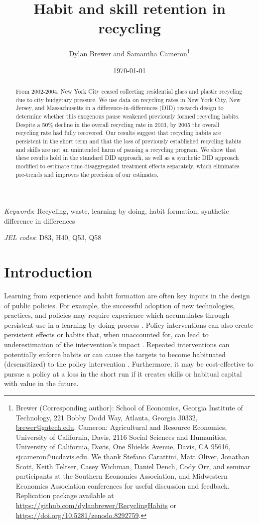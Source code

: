 \documentclass[12pt]{article}
\title{Habit and skill retention in recycling}
\author{Dylan Brewer and Samantha Cameron\thanks{Brewer (Corresponding author): School of Economics, Georgia Institute of Technology, 221 Bobby Dodd Way, Atlanta, Georgia 30332, \href{mailto:brewer@gatech.edu}{brewer@gatech.edu}.  Cameron: Agricultural and Resource Economics, University of California, Davis, 2116 Social Sciences and Humanities, University of California, Davis, One Shields Avenue, Davis, CA 95616, \href{mailto:sjcameron@ucdavis.edu}{sjcameron@ucdavis.edu}.  We thank Stefano Carattini, Matt Oliver, Jonathan Scott, Keith Teltser, Casey Wichman, Daniel Dench, Cody Orr, and seminar participants at the Southern Economics Association, and Midwestern Economics Association conferences for useful discussion and feedback. Replication package available at \href{https://github.com/dylanbrewer/RecyclingHabits}{https://github.com/dylanbrewer/RecyclingHabits} or \href{https://doi.org/10.5281/zenodo.8292759}{https://doi.org/10.5281/zenodo.8292759}.}}
\date{\today}
\begin{document}
\maketitle

\begin{abstract}
\begin{singlespace}
\noindent
From 2002-2004, New York City ceased collecting residential glass and plastic recycling due to city budgetary pressure.  We use data on recycling rates in New York City, New Jersey, and Massachusetts in a difference-in-differences (DID) research design to determine whether this exogenous pause weakened previously formed recycling habits.  Despite a 50\% decline in the overall recycling rate in 2003, by 2005 the overall recycling rate had fully recovered.  Our results suggest that recycling habits are persistent in the short term and that the loss of previously established recycling habits and skills are not an unintended harm of pausing a recycling program.  We show that these results hold in the standard DID approach, as well as a synthetic DID approach modified to estimate time-disaggregated treatment effects separately, which eliminates pre-trends and improves the precision of our estimates.
\end{singlespace}
\end{abstract}
\noindent \textit{Keywords}: Recycling, waste, learning by doing, habit formation, synthetic difference in differences

\noindent \textit{JEL codes}: D83, H40, Q53, Q58

\clearpage

\section{Introduction}

Learning from experience and habit formation are often key inputs in the design of public policies.  For example, the successful adoption of new technologies, practices, and policies may require experience which accumulates through persistent use in a learning-by-doing process \citep{fosterrosenzweig1995}.  Policy interventions can also create persistent effects or habits that, when unaccounted for, can lead to underestimation of the intervention's impact \citep{allcottrogers2014}.  Repeated interventions can potentially enforce habits or can cause the targets to become habituated (desensitized) to the policy intervention \citep{itoidatanaka2018}.  Furthermore, it may be cost-effective to pursue a policy at a loss in the short run if it creates skills or habitual capital with value in the future.
\end{document}

